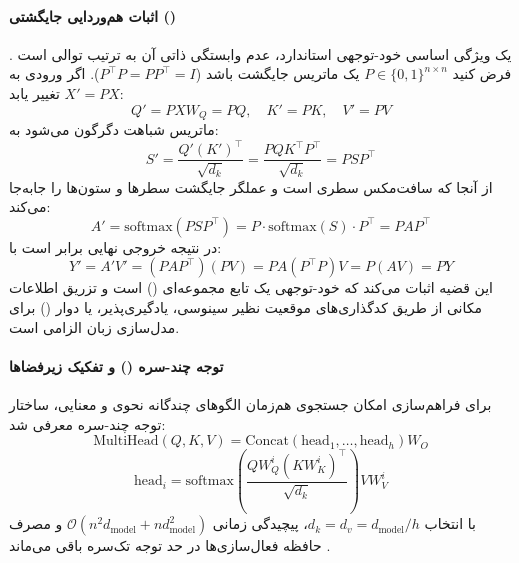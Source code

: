 \paragraph*{اثبات هم‌وردایی جایگشتی ()}
یک ویژگی اساسی خود-توجهی استاندارد، عدم وابستگی ذاتی آن به ترتیب توالی است \cite{hays2026attention}. فرض کنید $P \in \{0, 1\}^{n \times n}$ یک ماتریس جایگشت باشد ($P^\top P = P P^\top = I$). اگر ورودی به $X' = PX$ تغییر یابد:
\begin{equation}
    Q' = PX W_Q = P Q, \quad K' = P K, \quad V' = P V
\end{equation}
ماتریس شباهت دگرگون می‌شود به:
\begin{equation}
    S' = \frac{Q' (K')^\top}{\sqrt{d_k}} = \frac{P Q K^\top P^\top}{\sqrt{d_k}} = P S P^\top
\end{equation}
از آنجا که سافت‌مکس سطری است و عملگر جایگشت سطرها و ستون‌ها را جابه‌جا می‌کند:
\begin{equation}
    A' = \text{softmax}(P S P^\top) = P \cdot \text{softmax}(S) \cdot P^\top = P A P^\top
\end{equation}
در نتیجه خروجی نهایی برابر است با:
\begin{equation}
    Y' = A' V' = (P A P^\top)(P V) = P A (P^\top P) V = P (A V) = P Y
\end{equation}
این قضیه اثبات می‌کند که خود-توجهی یک تابع مجموعه‌ای () است و تزریق اطلاعات مکانی از طریق کدگذاری‌های موقعیت نظیر سینوسی، یادگیری‌پذیر، یا دوار () \cite{su2024roformer} برای مدل‌سازی زبان الزامی است.

\paragraph*{توجه چند-سره () و تفکیک زیرفضاها}
برای فراهم‌سازی امکان جستجوی هم‌زمان الگوهای چندگانه نحوی و معنایی، ساختار توجه چند-سره معرفی شد:
\begin{equation}
    \text{MultiHead}(Q, K, V) = \text{Concat}(\text{head}_1, \dots, \text{head}_h) W_O
\end{equation}
\begin{equation}
    \text{head}_i = \text{softmax}\left(\frac{Q W_Q^i (K W_K^i)^\top}{\sqrt{d_k}}\right) V W_V^i
\end{equation}
با انتخاب $d_k = d_v = d_{\text{model}} / h$، پیچیدگی زمانی $\mathcal{O}(n^2 d_{\text{model}} + n d_{\text{model}}^2)$ و مصرف حافظه فعال‌سازی‌ها در حد توجه تک‌سره باقی می‌ماند \cite{hays2026attention, serret2026understanding}.

